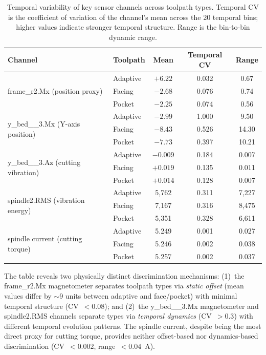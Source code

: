 \begin{table}[H]
\caption{Temporal variability of key sensor channels across toolpath types. Temporal CV is the coefficient of variation of the channel's mean across the 20 temporal bins; higher values indicate stronger temporal structure. Range is the bin-to-bin dynamic range.}\label{tab:temporal_cv}
\centering
\small
\begin{tabular}{llccc}
\toprule
\textbf{Channel} & \textbf{Toolpath} & \textbf{Mean} & \textbf{Temporal CV} & \textbf{Range} \\
\midrule
\multirow{3}{*}{frame\_r2.Mx (position proxy)} & Adaptive & $+6.22$ & 0.032 & 0.67 \\
& Facing & $-2.68$ & 0.076 & 0.74 \\
& Pocket & $-2.25$ & 0.074 & 0.56 \\
\midrule
\multirow{3}{*}{y\_bed\_\_3.Mx (Y-axis position)} & Adaptive & $-2.99$ & 1.000 & 9.50 \\
& Facing & $-8.43$ & 0.526 & 14.30 \\
& Pocket & $-7.73$ & 0.397 & 10.21 \\
\midrule
\multirow{3}{*}{y\_bed\_\_3.Az (cutting vibration)} & Adaptive & $-0.009$ & 0.184 & 0.007 \\
& Facing & $+0.019$ & 0.135 & 0.011 \\
& Pocket & $+0.014$ & 0.128 & 0.007 \\
\midrule
\multirow{3}{*}{spindle2.RMS (vibration energy)} & Adaptive & 5{,}762 & 0.311 & 7{,}227 \\
& Facing & 7{,}167 & 0.316 & 8{,}475 \\
& Pocket & 5{,}351 & 0.328 & 6{,}611 \\
\midrule
\multirow{3}{*}{spindle current (cutting torque)} & Adaptive & 5.249 & 0.001 & 0.027 \\
& Facing & 5.246 & 0.002 & 0.038 \\
& Pocket & 5.257 & 0.002 & 0.037 \\
\bottomrule
\end{tabular}
\end{table}

The table reveals two physically distinct discrimination mechanisms: (1)~the frame\_r2.Mx magnetometer separates toolpath types via \emph{static offset} (mean values differ by $\sim$9 units between adaptive and face/pocket) with minimal temporal structure (CV~$< 0.08$); and (2)~the y\_bed\_\_3.Mx magnetometer and spindle2.RMS channels separate types via \emph{temporal dynamics} (CV~$> 0.3$) with different temporal evolution patterns. The spindle current, despite being the most direct proxy for cutting torque, provides neither offset-based nor dynamics-based discrimination (CV~$< 0.002$, range~$< 0.04$~A).

